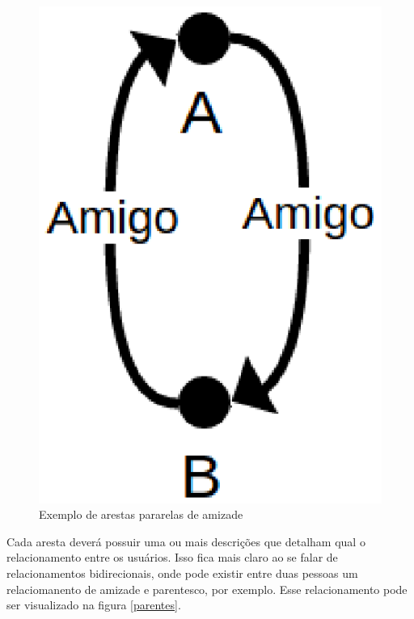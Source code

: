 \begin{figure}[!h]
	\centering
	\includegraphics[scale=0.45]{figuras/capitulo5/amigo.eps}
	\caption{Exemplo de arestas pararelas de amizade}
	\label{amigo}
\end{figure}

Cada aresta deverá possuir uma ou mais descrições que detalham qual o relacionamento entre os usuários. Isso fica mais claro ao se falar de relacionamentos bidirecionais, onde pode existir entre duas pessoas um relaciomanento de amizade e parentesco, por exemplo. Esse relacionamento pode ser visualizado na figura \ref{parentes}.

\newpage

